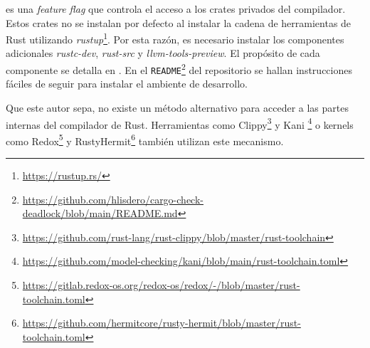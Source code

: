  es una \textit{feature flag} que controla el acceso a los crates privados del
compilador. Estos crates no se instalan por defecto al instalar la cadena de herramientas de Rust
utilizando \emph{rustup}\footnote{\url{https://rustup.rs/}}.
Por esta razón, es necesario instalar los componentes adicionales \emph{rustc-dev},
\emph{rust-src} y \emph{llvm-tools-preview}.
El propósito de cada componente se detalla en \cite{rustup-book}.
En el \texttt{README}\footnote{\url{https://github.com/hlisdero/cargo-check-deadlock/blob/main/README.md}}
del repositorio se hallan instrucciones fáciles de seguir para instalar el ambiente de desarrollo.

Que este autor sepa, no existe un método alternativo para acceder a las partes internas del
compilador de Rust. Herramientas como
Clippy\footnote{\url{https://github.com/rust-lang/rust-clippy/blob/master/rust-toolchain}} y
Kani \footnote{\url{https://github.com/model-checking/kani/blob/main/rust-toolchain.toml}} o
kernels como Redox\footnote{\url{https://gitlab.redox-os.org/redox-os/redox/-/blob/master/rust-toolchain.toml}} y
RustyHermit\footnote{\url{https://github.com/hermitcore/rusty-hermit/blob/master/rust-toolchain.toml}}
también utilizan este mecanismo.